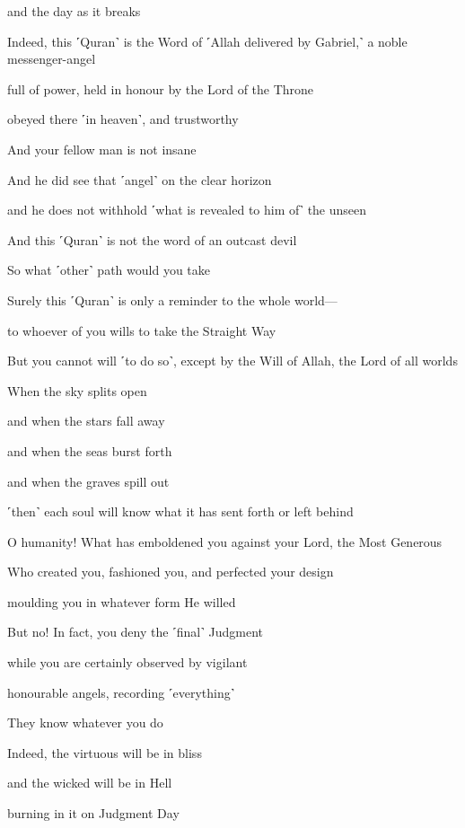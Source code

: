 and the day as it breaks

Indeed, this ˹Quran˺ is the Word of ˹Allah delivered by Gabriel,˺ a noble messenger-angel

full of power, held in honour by the Lord of the Throne

obeyed there ˹in heaven˺, and trustworthy

And your fellow man is not insane

And he did see that ˹angel˺ on the clear horizon

and he does not withhold ˹what is revealed to him of˺ the unseen

And this ˹Quran˺ is not the word of an outcast devil

So what ˹other˺ path would you take

Surely this ˹Quran˺ is only a reminder to the whole world—

to whoever of you wills to take the Straight Way

But you cannot will ˹to do so˺, except by the Will of Allah, the Lord of all worlds

When the sky splits open

and when the stars fall away

and when the seas burst forth

and when the graves spill out

˹then˺ each soul will know what it has sent forth or left behind

O humanity! What has emboldened you against your Lord, the Most Generous

Who created you, fashioned you, and perfected your design

moulding you in whatever form He willed

But no! In fact, you deny the ˹final˺ Judgment

while you are certainly observed by vigilant

honourable angels, recording ˹everything˺

They know whatever you do

Indeed, the virtuous will be in bliss

and the wicked will be in Hell

burning in it on Judgment Day

